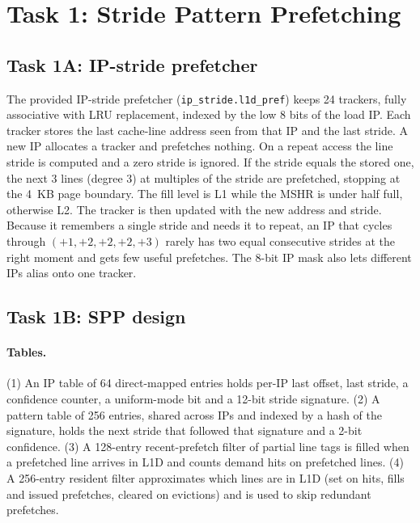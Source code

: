 
\section{Task 1: Stride Pattern Prefetching}

\subsection{Task 1A: IP-stride prefetcher}
The provided IP-stride prefetcher (\texttt{ip\_stride.l1d\_pref}) keeps 24 trackers, fully associative with LRU replacement, indexed by the low 8 bits of the load IP.
Each tracker stores the last cache-line address seen from that IP and the last stride.
A new IP allocates a tracker and prefetches nothing.
On a repeat access the line stride is computed and a zero stride is ignored.
If the stride equals the stored one, the next 3 lines (degree 3) at multiples of the stride are prefetched, stopping at the 4~KB page boundary.
The fill level is L1 while the MSHR is under half full, otherwise L2.
The tracker is then updated with the new address and stride.
Because it remembers a single stride and needs it to repeat, an IP that cycles through $(+1,+2,+2,+2,+3)$ rarely has two equal consecutive strides at the right moment and gets few useful prefetches.
The 8-bit IP mask also lets different IPs alias onto one tracker.

\subsection{Task 1B: SPP design}
\paragraph{Tables.}
(1) An IP table of 64 direct-mapped entries holds per-IP last offset, last stride, a confidence counter, a uniform-mode bit and a 12-bit stride signature.
(2) A pattern table of 256 entries, shared across IPs and indexed by a hash of the signature, holds the next stride that followed that signature and a 2-bit confidence.
(3) A 128-entry recent-prefetch filter of partial line tags is filled when a prefetched line arrives in L1D and counts demand hits on prefetched lines.
(4) A 256-entry resident filter approximates which lines are in L1D (set on hits, fills and issued prefetches, cleared on evictions) and is used to skip redundant prefetches.

